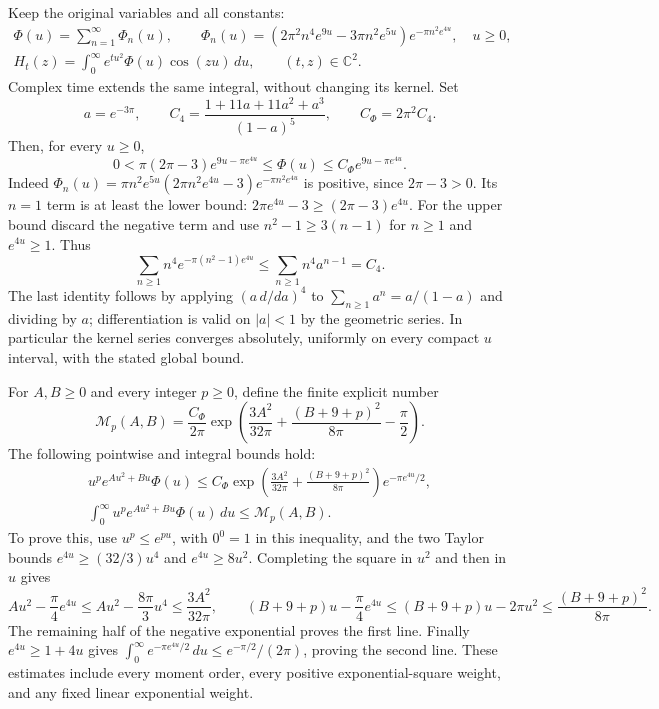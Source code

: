 \documentclass[11pt]{article}
\theoremstyle{definition}
\begin{document}
Keep the original variables and all constants:
\begin{equation}\tag{THS1}
\begin{gathered}
 \Phi(u)=\sum_{n=1}^{\infty}\Phi_n(u),\qquad
 \Phi_n(u)=(2\pi^2n^4e^{9u}-3\pi n^2e^{5u})e^{-\pi n^2e^{4u}},
 \quad u\ge0,\\
 H_t(z)=\int_0^\infty e^{tu^2}\Phi(u)\cos(zu)\,du,
 \qquad (t,z)\in\mathbb C^2.
\end{gathered}
\end{equation}
Complex time extends the same integral, without changing its kernel.
Set
\begin{equation}\tag{THS2}
 a=e^{-3\pi},\qquad
 C_4=\frac{1+11a+11a^2+a^3}{(1-a)^5},\qquad C_\Phi=2\pi^2C_4.
\end{equation}
Then, for every $u\ge0$,
\begin{equation}\tag{THS3}
 0<\pi(2\pi-3)e^{9u-\pi e^{4u}}
       \le\Phi(u)\le C_\Phi e^{9u-\pi e^{4u}}.
\end{equation}
Indeed
$\Phi_n(u)=\pi n^2e^{5u}(2\pi n^2e^{4u}-3)e^{-\pi n^2e^{4u}}$
is positive, since $2\pi-3>0$. Its $n=1$ term is at least the
lower bound: $2\pi e^{4u}-3\ge(2\pi-3)e^{4u}$.
For the upper bound discard the negative term and use
$n^2-1\ge3(n-1)$ for $n\ge1$ and $e^{4u}\ge1$. Thus
\[
 \sum_{n\ge1}n^4e^{-\pi(n^2-1)e^{4u}}
 \le\sum_{n\ge1}n^4a^{n-1}=C_4.
\]
The last identity follows by applying $(a\,d/da)^4$ to
$\sum_{n\ge1}a^n=a/(1-a)$ and dividing by $a$; differentiation
is valid on $|a|<1$ by the geometric series. In particular the
kernel series converges absolutely, uniformly on every compact
$u$ interval, with the stated global bound.

For $A,B\ge0$ and every integer $p\ge0$, define the finite
explicit number
\begin{equation}\tag{THS4}
 \mathcal M_p(A,B)=\frac{C_\Phi}{2\pi}
 \exp\left(\frac{3A^2}{32\pi}
            +\frac{(B+9+p)^2}{8\pi}-\frac\pi2\right).
\end{equation}
The following pointwise and integral bounds hold:
\begin{equation}\tag{THS5}
\begin{gathered}
 u^p e^{Au^2+Bu}\Phi(u)
 \le C_\Phi\exp\left(\frac{3A^2}{32\pi}
                  +\frac{(B+9+p)^2}{8\pi}\right)
                e^{-\pi e^{4u}/2},\\
 \int_0^\infty u^p e^{Au^2+Bu}\Phi(u)\,du
                  \le\mathcal M_p(A,B).
\end{gathered}
\end{equation}
To prove this, use $u^p\le e^{pu}$, with $0^0=1$ in this
inequality, and the two Taylor bounds
$e^{4u}\ge(32/3)u^4$ and $e^{4u}\ge8u^2$.
Completing the square in $u^2$ and then in $u$ gives
\[
 Au^2-\frac\pi4e^{4u}
       \le Au^2-\frac{8\pi}{3}u^4\le\frac{3A^2}{32\pi},\qquad
 (B+9+p)u-\frac\pi4e^{4u}
       \le(B+9+p)u-2\pi u^2\le\frac{(B+9+p)^2}{8\pi}.
\]
The remaining half of the negative exponential proves the first
line. Finally $e^{4u}\ge1+4u$ gives
$\int_0^\infty e^{-\pi e^{4u}/2}\,du\le e^{-\pi/2}/(2\pi)$,
proving the second line. These estimates include every moment
order, every positive exponential-square weight, and any fixed
linear exponential weight.
\end{document}
